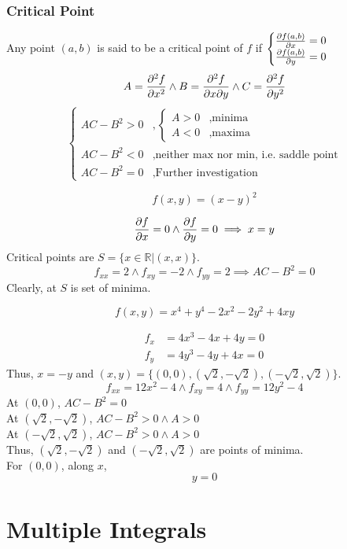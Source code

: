 \subsection{Critical Point}
Any point $(a,b)$ is said to be a critical point of $f$ if $\begin{cases}
	\pdv{f(a,b)}{x}=0\\
	\pdv{f(a,b)}{y}=0
\end{cases}$
\[A=\pdv[2]{f}{x}\land B=\pdv{f}{x}{y}\land C=\pdv[2]{f}{y}\]
\[\begin{cases}
	AC-B^2>0 &, \begin{cases}
		A>0 &, \text{minima}\\
		A<0 &, \text{maxima}
	\end{cases} \\
	AC-B^2<0 &, \text{neither max nor min, i.e. saddle point}\\
	AC-B^2=0 &, \text{Further investigation}
\end{cases}\]
\begin{eg}
	\[f(x,y)=(x-y)^2\]
\end{eg}
\begin{explanation}
	\[\pdv{f}{x}=0\land \pdv{f}{y}=0\implies x=y\]
	Critical points are $S=\{x\in\mathbb{R}|(x,x)\}$.
	\[f_{xx}=2\land f_{xy}=-2\land f_{yy}=2\implies AC-B^2=0\]
	Clearly, at $S$ is set of minima.
\end{explanation}
\begin{eg}
	\[f(x,y)=x^4+y^4-2x^2-2y^2+4xy\]
\end{eg}
\begin{explanation}
	\[\begin{split}
		f_x&=4x^3-4x+4y=0\\
		f_y&=4y^3-4y+4x=0
	\end{split}\]
	Thus, $x=-y$ and $(x,y)=\{(0,0),(\sqrt{2},-\sqrt{2}),(-\sqrt{2},\sqrt{2})\}$.
	\[f_{xx}=12x^2-4\land f_{xy}=4\land f_{yy}=12y^2-4\]
	At $(0,0)$, $AC-B^2=0$\\
	At $(\sqrt{2},-\sqrt{2})$, $AC-B^2>0\land A>0$\\
	At $(-\sqrt{2},\sqrt{2})$, $AC-B^2>0\land A>0$\\
	Thus, $(\sqrt{2},-\sqrt{2})$ and $(-\sqrt{2},\sqrt{2})$ are points of minima.\\
	For $(0,0)$, along $x$,
	\[y=0\]
\end{explanation}







\chapter{Multiple Integrals}
